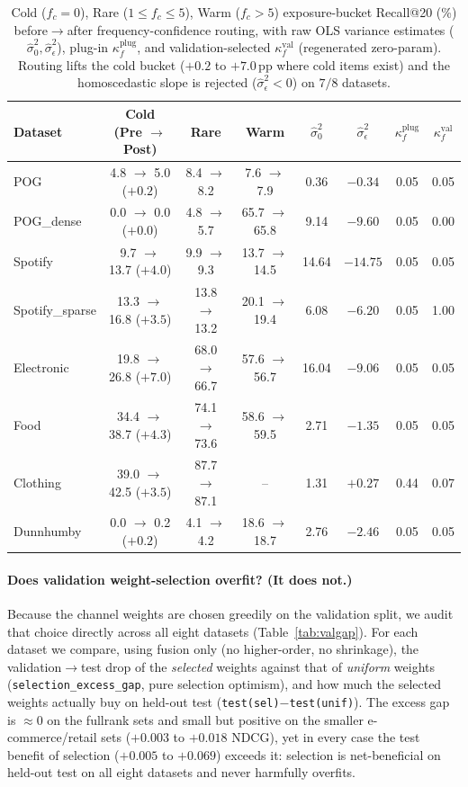 \begin{table}[t]\centering\small
\caption{Cold ($f_c=0$), Rare ($1\le f_c\le 5$), Warm ($f_c>5$) exposure-bucket Recall@20 (\%) before$\to$after
frequency-confidence routing, with raw OLS variance estimates ($\hat{\sigma}_0^2, \hat{\sigma}_\epsilon^2$),
plug-in $\kappa_f^{\text{plug}}$, and validation-selected $\kappa_f^{\text{val}}$ (regenerated zero-param). Routing
lifts the cold bucket ($+0.2$ to $+7.0$\,pp where cold items exist) and the homoscedastic slope is rejected
($\hat{\sigma}_\epsilon^2<0$) on $7/8$ datasets.}
\label{tab:exposure_buckets}
\setlength{\tabcolsep}{3.2pt}
\begin{tabular}{l ccc cccc}
\toprule
Dataset & Cold (Pre $\to$ Post) & Rare & Warm & $\hat{\sigma}_0^2$ & $\hat{\sigma}_\epsilon^2$ & $\kappa_f^{\text{plug}}$ & $\kappa_f^{\text{val}}$ \\
\midrule
POG             &  4.8 $\to$  5.0 ($+0.2$) &  8.4 $\to$  8.2 &  7.6 $\to$  7.9 &  0.36 & $-0.34$ & 0.05 & 0.05 \\
POG\_dense      &  0.0 $\to$  0.0 ($+0.0$) &  4.8 $\to$  5.7 & 65.7 $\to$ 65.8 &  9.14 & $-9.60$ & 0.05 & 0.00 \\
Spotify         &  9.7 $\to$ 13.7 ($+4.0$) &  9.9 $\to$  9.3 & 13.7 $\to$ 14.5 & 14.64 & $-14.75$ & 0.05 & 0.05 \\
Spotify\_sparse & 13.3 $\to$ 16.8 ($+3.5$) & 13.8 $\to$ 13.2 & 20.1 $\to$ 19.4 &  6.08 & $-6.20$ & 0.05 & 1.00 \\
Electronic      & 19.8 $\to$ 26.8 ($+7.0$) & 68.0 $\to$ 66.7 & 57.6 $\to$ 56.7 & 16.04 & $-9.06$ & 0.05 & 0.05 \\
Food            & 34.4 $\to$ 38.7 ($+4.3$) & 74.1 $\to$ 73.6 & 58.6 $\to$ 59.5 &  2.71 & $-1.35$ & 0.05 & 0.05 \\
Clothing        & 39.0 $\to$ 42.5 ($+3.5$) & 87.7 $\to$ 87.1 &     --          &  1.31 & $+0.27$ & 0.44 & 0.07 \\
Dunnhumby       &  0.0 $\to$  0.2 ($+0.2$) &  4.1 $\to$  4.2 & 18.6 $\to$ 18.7 &  2.76 & $-2.46$ & 0.05 & 0.05 \\
\bottomrule
\end{tabular}
\end{table}

\paragraph{Does validation weight-selection overfit? (It does not.)}
Because the channel weights are chosen greedily on the validation split, we audit that choice directly across all
eight datasets (Table~\ref{tab:valgap}). For each dataset we compare, using fusion only (no higher-order, no
shrinkage), the validation$\to$test drop of the \emph{selected} weights against that of \emph{uniform} weights
(\texttt{selection\_excess\_gap}, pure selection optimism), and how much the selected weights actually buy on
held-out test (\texttt{test(sel)$-$test(unif)}). The excess gap is ${\approx}0$ on the fullrank sets and small but
positive on the smaller e-commerce/retail sets ($+0.003$ to $+0.018$ NDCG), yet in every case the test benefit of
selection ($+0.005$ to $+0.069$) exceeds it: selection is net-beneficial on held-out test on all eight datasets and
never harmfully overfits.


